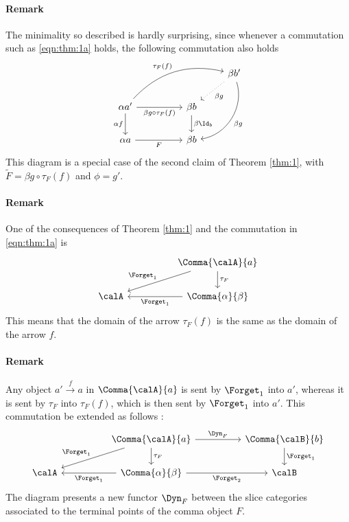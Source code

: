 \documentclass[12pt,oneside]{article}
\begin{document}
\paragraph{Remark} The minimality so described is hardly surprising, since whenever a commutation such as \eqref{eqn:thm:1a} holds, the following commutation also holds
%
\[\begin{tikzcd}
	& & & \beta b' \arrow[ldd, "\beta g", bend left=50] \arrow[ld, "\beta g", dotted] \\
	\alpha a' \arrow[d, "\alpha f"'] \arrow[rr, "\beta g \circ \tau_{F}(f)"'] \arrow[rrru, "\tau_{F}(f)", bend left] & & \beta b \arrow[d, "\beta \Id_{b}"] & \\
	\alpha a \arrow[rr, "F"'] & & \beta b & 
\end{tikzcd}\]
%
This diagram is a special case of the second claim of Theorem \ref{thm:1}, with $\tilde F = \beta g \circ \tau_{F}(f)$ and $\phi=g'$.

\paragraph{Remark} One of the consequences of Theorem \ref{thm:1} and the commutation in \eqref{eqn:thm:1a} is 
%
\[\begin{tikzcd} 
	& & \Comma{\calA}{a} \arrow{dll}[swap]{\Forget_1} \arrow{d}{\tau_F} \\ 
	\calA & & \Comma{\alpha}{\beta} \arrow{ll}{\Forget_1}    
\end{tikzcd}\]
%
This means that the domain of the arrow $\tau_{F}(f)$ is the same as the domain of the arrow $f$.

\paragraph{Remark} Any object $a' \xrightarrow{f} a$ in $\Comma{\calA}{a}$ is sent by $\Forget_1$ into $a'$, whereas it is sent by $\tau_F$ into $\tau_F(f)$, which is then sent by $\Forget_1$ into $a'$. This commutation be extended as follows : 
%
\begin{equation} \label{eqn:def:Dyn}
	\begin{tikzcd} 
		& & \Comma{\calA}{a} \arrow{rr}{\Dyn_F} \arrow{dll}[swap]{\Forget_1} \arrow{d}{\tau_F} & & \Comma{\calB}{b} \arrow{d}{ \Forget_1 } \\ 
		\calA & & \Comma{\alpha}{\beta} \arrow{ll}{\Forget_1} \arrow{rr}[swap]{\Forget_2} & & \calB
	\end{tikzcd}
\end{equation}
%
The  diagram presents a new functor $\Dyn_F$ between the slice categories associated to the terminal points of the comma object $F$.  
\end{document}
